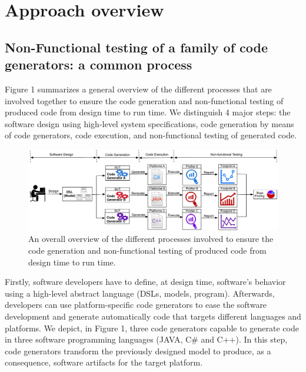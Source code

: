 


\section{Approach overview}

\subsection{Non-Functional  testing of a family of code generators: a common process}

Figure 1 summarizes a general overview of the different processes that are involved together to ensure the code generation and non-functional testing of produced code from design time to run time. We distinguish 4 major steps: the software design using high-level system specifications, code generation by means of code generators, code execution, and non-functional testing of generated code. 


\begin{figure}[t]
	\includegraphics[width=1\linewidth]{Ressources/background.pdf}
	\caption{An overall overview of the different processes involved to ensure the code generation and non-functional testing of produced code from design time to run time.}
\end{figure}


Firstly, software developers have to define, at design time, software's behavior using a high-level abstract language (DSLs, models, program). Afterwards, developers can use platform-specific code generators to ease the software development and generate automatically code that targets different languages and platforms. We depict, in Figure 1, three code generators capable to generate code in three software programming languages (JAVA, C\# and C++). In this step, code generators transform the previously designed model to produce, as a consequence, software artifacts for the target platform.

